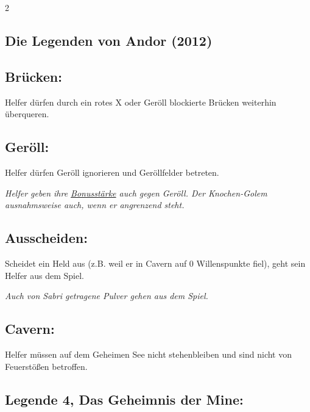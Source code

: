 \documentclass[10pt, a4paper, oneside]{book}
\newcommand{\fan}[1]{\textit{#1}}
\begin{document}
\begin{multicols*}{2}
\begin{nobgcolor}
\end{nobgcolor}









\begin{bgcolor}
\section{Die Legenden von Andor (2012)}

\subsection{Brücken:}

Helfer dürfen durch ein rotes X oder Geröll blockierte Brücken weiterhin überqueren.
\supercite{15332,ag-begleitheft,mh-begleitheft}


\subsection{Geröll:}

Helfer dürfen Geröll ignorieren und Geröllfelder betreten.
\supercite{6937,97438,ag-begleitheft,mh-begleitheft}

\fan{Helfer geben ihre \hyperref[bonusstaerke]{Bonusstärke} auch gegen Geröll. Der Knochen-Golem ausnahmsweise auch, wenn er angrenzend steht.}



\subsection{Ausscheiden:}

Scheidet ein Held aus (z.B. weil er in Cavern auf 0 Willenspunkte fiel), geht sein Helfer aus dem Spiel.
\supercite{35653}

\fan{Auch von Sabri getragene Pulver gehen aus dem Spiel.}


\subsection{Cavern:}

Helfer müssen auf dem Geheimen See nicht stehenbleiben\supercite{nh-begleitheft} und sind nicht von Feuerstößen betroffen.



\subsection{Legende 4, Das Geheimnis der Mine:}


\end{bgcolor}
\end{multicols*}
\end{document}
